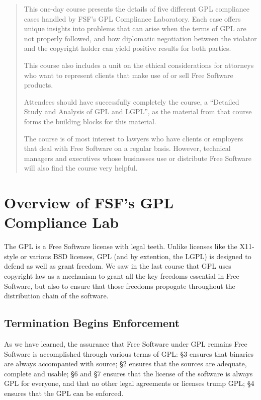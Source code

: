 \documentclass[12pt]{report}
\begin{document}
\begin{abstract}


This one-day course presents the details of five different GPL compliance
cases handled by FSF's GPL Compliance Laboratory.  Each case offers unique
insights into problems that can arise when the terms of GPL are not
properly followed, and how diplomatic negotiation between the violator and
the copyright holder can yield positive results for both parties.

This course also includes a unit on the ethical considerations for
attorneys who want to represent clients that make use of or sell Free
Software products.

Attendees should have successfully completely the course, a ``Detailed
Study and Analysis of GPL and LGPL'', as the material from that course
forms the building blocks for this material.

The course is of most interest to lawyers who have clients or employers
that deal with Free Software on a regular basis.  However, technical
managers and executives whose businesses use or distribute Free Software
will also find the course very helpful.

\end{abstract}

\tableofcontents

\pagebreak


\chapter{Overview of FSF's GPL Compliance Lab}

The GPL is a Free Software license with legal teeth.  Unlike licenses like
the X11-style or various BSD licenses, GPL (and by extention, the LGPL) is
designed to defend as well as grant freedom.  We saw in the last course
that GPL uses copyright law as a mechanism to grant all the key freedoms
essential in Free Software, but also to ensure that those freedoms
propogate throughout the distribution chain of the software.

\section{Termination Begins Enforcement}

As we have learned, the assurance that Free Software under GPL remains
Free Software is accomplished through various terms of GPL: \S 3 ensures
that binaries are always accompanied with source; \S 2 ensures that the
sources are adequate, complete and usable; \S 6 and \S 7 ensures that the
license of the software is always GPL for everyone, and that no other
legal agreements or licenses trump GPL; \S 4 ensures that the GPL can be
enforced.
\end{document}
